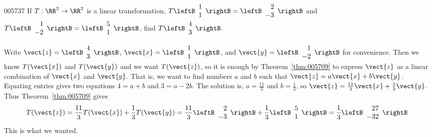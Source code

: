 \begin{example}{}{005737}
If $T : \RR^{2} \to \RR^{2}$ is a linear transformation, $T \leftB \begin{array}{r}
1 \\
1
\end{array} \rightB = \leftB \begin{array}{r}
2 \\
-3
\end{array} \rightB$
 and $T \leftB \begin{array}{r}
 1 \\
 -2
 \end{array} \rightB = \leftB \begin{array}{r}
 5 \\
 1
 \end{array} \rightB$,
 find $T \leftB \begin{array}{r}
 4 \\
 3
 \end{array} \rightB$.

\begin{solution}
  Write $\vect{z} = \leftB \begin{array}{r}
  4 \\
  3
  \end{array} \rightB$, $\vect{x} = \leftB \begin{array}{r}
  1 \\
  1
  \end{array} \rightB$, and $\vect{y} = \leftB \begin{array}{r}
 1 \\
 -2
 \end{array} \rightB$
 for convenience. Then we know $T(\vect{x})$ and $T(\vect{y})$ and we want $T(\vect{z})$, so it is enough by Theorem~\ref{thm:005709} to express $\vect{z}$ as a linear combination of $\vect{x}$ and $\vect{y}$. That is, we want to find numbers $a$ and $b$ such that $\vect{z} = a\vect{x} + b\vect{y}$. Equating entries gives two equations $4 = a + b$ and $3 = a - 2b$. The solution is, $a = \frac{11}{3}$
 and $b = \frac{1}{3}$, so $\vect{z} = \frac{11}{3}\vect{x} + \frac{1}{3}\vect{y}$.
 Thus Theorem~\ref{thm:005709} gives
\begin{equation*}
T(\vect{z}) = \frac{11}{3}T(\vect{x}) + \frac{1}{3}T(\vect{y}) = \frac{11}{3} \leftB \begin{array}{r}
2 \\
-3
\end{array} \rightB + \frac{1}{3} \leftB \begin{array}{r}
5 \\
1
\end{array} \rightB = \frac{1}{3} \leftB \begin{array}{r}
27 \\
-32
\end{array} \rightB
\end{equation*}
This is what we wanted.
\end{solution}
\end{example}


